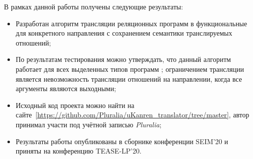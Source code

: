 В рамках данной работы получены следующие результаты:
\begin{itemize}
    \item Разработан алгоритм трансляции реляционных программ в функциональные для конкретного направления с сохранением семантики транслируемых отношений;
    \item По результатам тестирования можно утверждать, что данный алгоритм работает для всех выделенных типов программ \miniKanren{}; ограничением трансляции является невозможность трансляции отношений на направлении, когда все аргументы являются выходными;
    \item Исходный код проекта можно найти на сайте~\ref{https://github.com/Pluralia/uKanren_translator/tree/master}, автор принимал участи под учётной записью \emph{Pluralia};
    \item Результаты работы опубликованы в сборнике конференции SEIM'20 и приняты на конференцию TEASE-LP'20.
\end{itemize}
